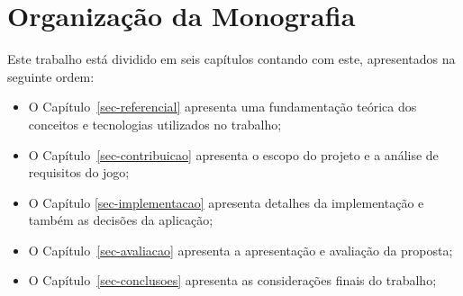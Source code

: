 \section{Organização da Monografia}
\label{sec-intro-organizacao}

Este trabalho está dividido em seis capítulos contando com este, apresentados na seguinte ordem:


\begin{itemize}
	\item O Capítulo~\ref{sec-referencial} apresenta uma fundamentação teórica dos conceitos e tecnologias
 utilizados no trabalho;
	
	\item O Capítulo~\ref{sec-contribuicao} apresenta o escopo do projeto e a análise de requisitos do jogo;

        \item O Capítulo \ref{sec-implementacao} apresenta detalhes da implementação e também as decisões da aplicação;
        
	\item O Capítulo~\ref{sec-avaliacao} apresenta a apresentação e avaliação da proposta;
	
	\item O Capítulo~\ref{sec-conclusoes} apresenta as considerações finais do trabalho;
	
\end{itemize}


